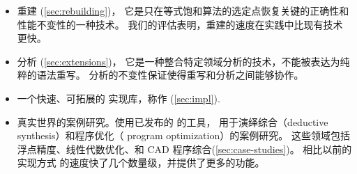 \begin{itemize}


\item 重建 (\autoref{sec:rebuilding})，
  它是只在等式饱和算法的选定点恢复关键的正确性和性能不变性的一种技术。
  我们的评估表明，重建的速度在实践中比现有技术更快。


\item \Eclass 分析 (\autoref{sec:extensions})，
  它是一种整合特定领域分析的技术，不能被表达为纯粹的语法重写。
  \eclass 分析的不变性保证使得重写和分析之间能够协作。




\item 一个快速、可拓展的 \egraphs 实现库，称作 \egg (\autoref{sec:impl}).


\item 真实世界的案例研究。使用已发布的 \egg 的工具，
    用于演绎综合（deductive synthesis）和程序优化（ program optimization）的案例研究。
    这些领域包括浮点精度、线性代数优化、和 CAD 程序综合(\autoref{sec:case-studies})。
   相比以前的实现方式 \egg 的速度快了几个数量级，并提供了更多的功能。
\end{itemize}

